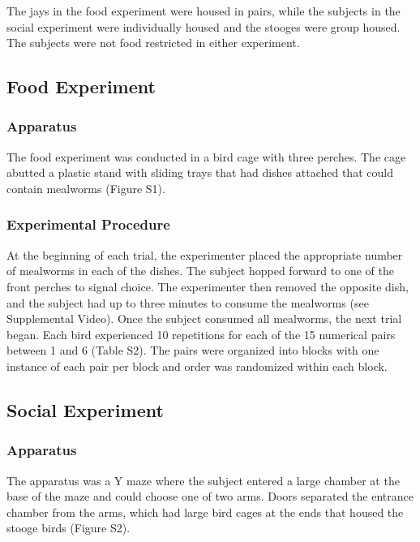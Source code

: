 \documentclass[
  ,doc,floatsintext]{apa6}
\begin{document}
The jays in the food experiment were housed in pairs, while the subjects in the social experiment were individually housed and the stooges were group housed. The subjects were not food restricted in either experiment.

\hypertarget{food-experiment}{%
\subsection{Food Experiment}\label{food-experiment}}

\hypertarget{apparatus}{%
\subsubsection{Apparatus}\label{apparatus}}

The food experiment was conducted in a bird cage with three perches. The cage abutted a plastic stand with sliding trays that had dishes attached that could contain mealworms (Figure S1).

\hypertarget{experimental-procedure}{%
\subsubsection{Experimental Procedure}\label{experimental-procedure}}

At the beginning of each trial, the experimenter placed the appropriate number of mealworms in each of the dishes. The subject hopped forward to one of the front perches to signal choice. The experimenter then removed the opposite dish, and the subject had up to three minutes to consume the mealworms (see Supplemental Video). Once the subject consumed all mealworms, the next trial began.
Each bird experienced 10 repetitions for each of the 15 numerical pairs between 1 and 6 (Table S2). The pairs were organized into blocks with one instance of each pair per block and order was randomized within each block.

\hypertarget{social-experiment}{%
\subsection{Social Experiment}\label{social-experiment}}

\hypertarget{apparatus-1}{%
\subsubsection{Apparatus}\label{apparatus-1}}

The apparatus was a Y maze where the subject entered a large chamber at the base of the maze and could choose one of two arms. Doors separated the entrance chamber from the arms, which had large bird cages at the ends that housed the stooge birds (Figure S2).
\end{document}
